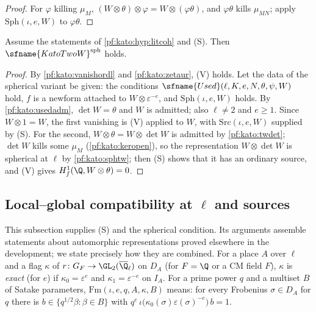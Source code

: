 \begin{proof}
For $\varphi$ killing $\mu_M$, $(W\otimes\theta)\otimes\varphi=W\otimes(\varphi\theta)$, and $\varphi\theta$ kills $\mu_{MN}$; apply
$\mathrm{Sph}(\iota,e,W)$ to $\varphi\theta$.
\end{proof}

\begin{theorem}\label{pf:kato:twos}
Assume the statements of \cref{pf:kato:hyp:litcoh} and \textup{(S)}. Then $\sfname{KatoTwoW}^{\mathrm{sph}}$ holds.
\end{theorem}

\begin{proof}
By \cref{pf:kato:vanishordl} and \cref{pf:kato:zetaur}, \textup{(V)} holds. Let the data of the spherical variant be
given: the conditions $\sfname{Used}(\ell,K,e,N,\theta,\psi,W)$ hold, $f$ is a newform attached to $W\otimes\varepsilon^{-e}$, and
$\mathrm{Sph}(\iota,e,W)$ holds. By \cref{pf:kato:usedadm}, $\det W=\theta$ and $W$ is
admitted; also $\ell\ne2$ and $e\ge1$. Since $W\otimes1=W$, the first vanishing is \textup{(V)} applied to $W$, with
$\mathrm{Src}(\iota,e,W)$ supplied by \textup{(S)}. For the second, $W\otimes\theta=W\otimes\det W$ is admitted by
\cref{pf:kato:twdet}; $\det W$ kills some $\mu_M$ (\cref{pf:kato:keropen}), so the representation $W\otimes\det W$ is
spherical at $\ell$ by \cref{pf:kato:sphtw}; then \textup{(S)} shows that it has an ordinary source, and \textup{(V)} gives
$\katoHf(\Q,W\otimes\theta)=0$.
\end{proof}

\subsection{Local--global compatibility at \texorpdfstring{$\ell$}{l} and sources}\label{pf:kato:sec:sph}

This subsection supplies \textup{(S)} and the spherical condition. Its arguments assemble statements about
automorphic representations proved elsewhere in the development; we state precisely how they are combined.
For a place $A$ over $\ell$ and a flag $\kappa$ of $r\colon G_F\to\GL_2(\katoQlb)$ on $D_A$ (for $F=\Q$ or a CM
field $F$), $\kappa$ is \emph{exact} (for $e$) if $\kappa_0=\varepsilon^{e}$ and $\kappa_1=\varepsilon^{-e}$ on $I_A$. For a prime
power $q$ and a multiset $B$ of Satake parameters, $\mathrm{Fm}(\iota,e,q,A,\kappa,B)$ means: for every
Frobenius $\sigma\in D_A$ for $q$ there is $b\in\{q^{1/2}\beta:\beta\in B\}$ with
$q^{e}\,\iota\bigl(\kappa_0(\sigma)\varepsilon(\sigma)^{-e}\bigr)\,b=1$.

